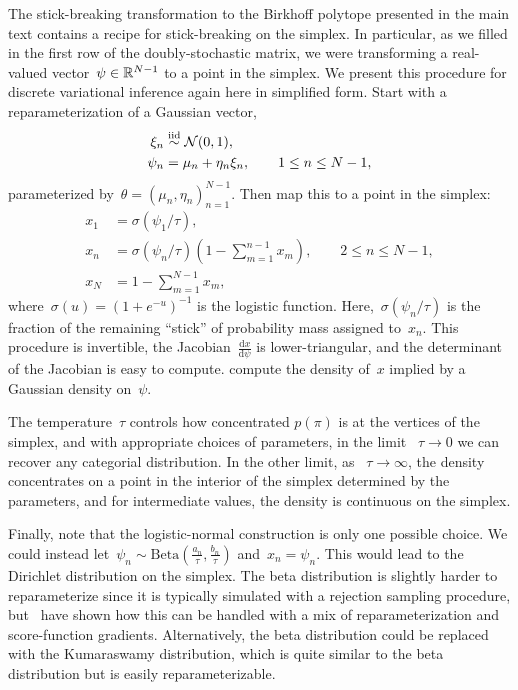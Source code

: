 \documentclass[twoside]{article}
\begin{document}
The stick-breaking transformation to the Birkhoff polytope presented
in the main text contains a recipe for stick-breaking on the simplex.
In particular, as we filled in the first row of the doubly-stochastic
matrix, we were transforming a real-valued vector~$\psi \in \mathbb{R}^{N-1}$
to a point in the simplex.  We present this procedure for
discrete variational inference again here in simplified form.
Start with a reparameterization of a Gaussian vector,
\begin{align*}
  \xi_n &\stackrel{\text{iid}}{\sim} \mathcal{N}(0, 1), \\
  \psi_n & = \mu_n + \eta_n \xi_n, \qquad 1 \leq n \leq N-1,
\end{align*}
parameterized by~${\theta = (\mu_n, \eta_n)_{n=1}^{N-1}}$. 
Then map this to a point in the simplex:
\begin{align*}
  x_1 &= \sigma(\psi_1 / \tau), \\
  x_n &= \sigma(\psi_n / \tau) \left(1- \sum_{m=1}^{n-1} x_m\right), \qquad 2 \leq n \leq N-1,  \\
  x_N &= 1- \sum_{m=1}^{N-1} x_m,
\end{align*}
where~${\sigma(u) = (1+e^{-u})^{-1}}$ is the logistic
function. Here,~$\sigma(\psi_n/\tau)$ is the fraction of the remaining
``stick'' of probability mass assigned to~$x_n$.  This procedure is
invertible, the Jacobian~$\frac{\mathrm{d}x}{\mathrm{d}\psi}$ is
lower-triangular, and the determinant of the Jacobian is easy to
compute.  \citet{linderman2015dependent} compute the density of~$x$
implied by a Gaussian density on~$\psi$.

The temperature~$\tau$ controls how concentrated $p(\pi)$ is at the
vertices of the simplex, and with appropriate choices of parameters,
in the limit ~$\tau \to 0$ we can recover any categorial
distribution. In the other limit, as ~$\tau \to \infty$, the density
concentrates on a point in the interior of the simplex determined by
the parameters, and for intermediate values, the density is continuous
on the simplex.

Finally, note that the logistic-normal construction is only one possible
choice.  We could instead
let~${\psi_n \sim \mathrm{Beta}(\tfrac{a_n}{\tau}, \tfrac{b_n}{\tau})}$
and~${x_n = \psi_n}$. This would lead to the Dirichlet distribution on
the simplex.  The beta distribution is slightly harder to
reparameterize since it is typically simulated with a rejection
sampling procedure, but~\citet{naesseth2017reparameterization} have
shown how this can be handled with a mix of reparameterization and
score-function gradients.  Alternatively, the beta distribution could
be replaced with the Kumaraswamy distribution, which is quite similar
to the beta distribution but is easily reparameterizable.
\end{document}
